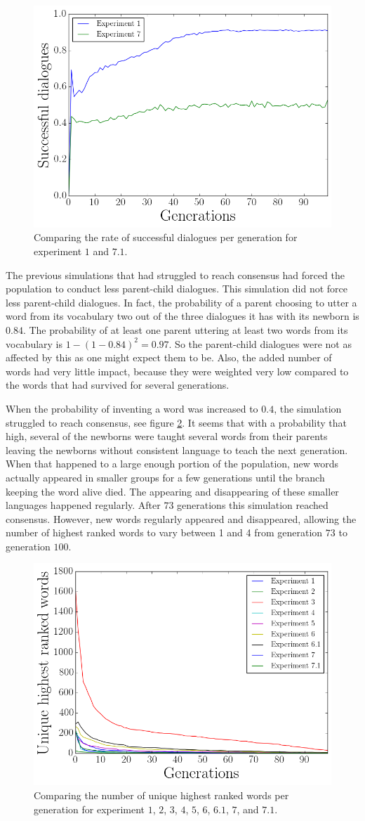 \begin{figure}
    \centering
    \includegraphics[width=0.7\linewidth]{fig/Discussion/DialogueComparison}
    \caption{Comparing the rate of successful dialogues per generation for experiment $1$ and $7.1$.}
    \label{fig:DialogueComp}
\end{figure}

The previous simulations that had struggled to reach consensus had forced the population to conduct less parent-child dialogues. This simulation did not force less parent-child dialogues. In fact, the probability of a parent choosing to utter a word from its vocabulary two out of the three dialogues it has with its newborn is $0.84$. The probability of at least one parent uttering at least two words from its vocabulary is $1 - (1-0.84)^2 = 0.97$. So the parent-child dialogues were not as affected by this as one might expect them to be. Also, the added number of words had very little impact, because they were weighted very low compared to the words that had survived for several generations. 

When the probability of inventing a word was increased to $0.4$, the simulation struggled to reach consensus, see figure \ref{fig:hrwComp}. It seems that with a probability that high, several of the newborns were taught several words from their parents leaving the newborns without consistent language to teach the next generation. When that happened to a large enough portion of the population, new words actually appeared in smaller groups for a few generations until the branch keeping the word alive died. The appearing and disappearing of these smaller languages happened regularly. After $73$ generations this simulation reached consensus. However, new words regularly appeared and disappeared, allowing the number of highest ranked words to vary between 1 and 4 from generation $73$ to generation $100$.

\begin{figure}
    \centering
    \includegraphics[width=0.7\linewidth]{fig/Discussion/hrwComparison}
    \caption{Comparing the number of unique highest ranked words per generation for experiment $1$, $2$, $3$, $4$, $5$, $6$, $6.1$, $7$, and $7.1$.}
    \label{fig:hrwComp}
\end{figure}